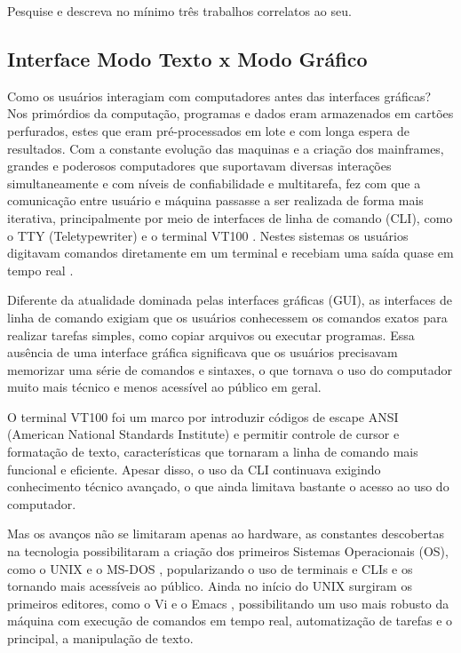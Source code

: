 Pesquise e descreva no mínimo três trabalhos correlatos ao seu.

\subsection{Interface Modo Texto x Modo Gráfico}

Como os usuários interagiam com computadores antes das interfaces gráficas? Nos primórdios da computação, programas e dados eram armazenados em cartões
perfurados, estes que eram pré-processados em lote e com longa espera de resultados. Com a constante evolução das maquinas e a criação dos mainframes,
grandes e poderosos computadores que suportavam diversas interações simultaneamente e com níveis de confiabilidade e multitarefa, fez com que a comunicação
entre usuário e máquina passasse a ser realizada de forma mais iterativa, principalmente por meio de interfaces de linha de comando (CLI),
como o TTY (Teletypewriter) \cite{ColumbiaTeletype2023} e o terminal VT100 \cite{DEC_VT100}. Nestes sistemas os usuários digitavam comandos diretamente em um
terminal e recebiam uma saída quase em tempo real \cite{ComputerHistoryMuseum}.

Diferente da atualidade dominada pelas interfaces gráficas (GUI), as interfaces de linha de comando exigiam que os usuários conhecessem os comandos exatos
para realizar tarefas simples, como copiar arquivos ou executar programas. Essa ausência de uma interface gráfica significava que os usuários precisavam
memorizar uma série de comandos e sintaxes, o que tornava o uso do computador muito mais técnico e menos acessível ao público em geral.

O terminal VT100 foi um marco por introduzir códigos de escape ANSI (American National Standards Institute) e permitir controle de cursor e formatação de texto,
características que tornaram a linha de comando mais funcional e eficiente. Apesar disso, o uso da CLI continuava exigindo conhecimento técnico avançado, o que
ainda limitava bastante o acesso ao uso do computador.

Mas os avanços não se limitaram apenas ao hardware, as constantes descobertas na tecnologia possibilitaram a criação dos primeiros Sistemas Operacionais (OS),
como o UNIX \cite{UnixArchive} e o MS-DOS \cite{ComputerHistoryMuseum}, popularizando o uso de terminais e CLIs e os tornando mais acessíveis ao público. Ainda
no início do UNIX surgiram os primeiros editores, como o Vi \cite{Joy_Vi} e o Emacs \cite{Stallman1981}, possibilitando um uso mais robusto da máquina com
execução de comandos em tempo real, automatização de tarefas e o principal, a manipulação de texto.

